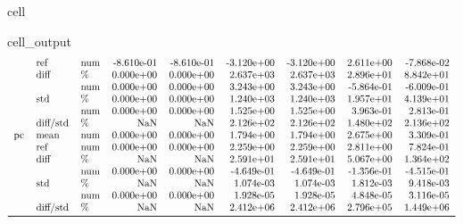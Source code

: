\documentclass[letterpaper,table,10pt,english]{jupyterBook}
\begin{document}
\begin{sphinxuseclass}{cell}
\begin{sphinxVerbatimOutput}
\begin{sphinxuseclass}{cell_output}
\begin{equation*}
\begin{split}
\begin{tabular}{lllrrrrrr}
   & ref & num & -8.610e-01 & -8.610e-01 & -3.120e+00 & -3.120e+00 &  2.611e+00 & -7.868e-02 \\
   & diff & \% &  0.000e+00 &  0.000e+00 &  2.637e+03 &  2.637e+03 &  2.896e+01 &  8.842e+01 \\
   &          & num &  0.000e+00 &  0.000e+00 &  3.243e+00 &  3.243e+00 & -5.864e-01 & -6.009e-01 \\
   & std & \% &  0.000e+00 &  0.000e+00 &  1.240e+03 &  1.240e+03 &  1.957e+01 &  4.139e+01 \\
   &          & num &  0.000e+00 &  0.000e+00 &  1.525e+00 &  1.525e+00 &  3.963e-01 &  2.813e-01 \\
   & diff/std & \% &        NaN &        NaN &  2.126e+02 &  2.126e+02 &  1.480e+02 &  2.136e+02 \\
pc & mean & num &  0.000e+00 &  0.000e+00 &  1.794e+00 &  1.794e+00 &  2.675e+00 &  3.309e-01 \\
   & ref & num &  0.000e+00 &  0.000e+00 &  2.259e+00 &  2.259e+00 &  2.811e+00 &  7.824e-01 \\
   & diff & \% &        NaN &        NaN &  2.591e+01 &  2.591e+01 &  5.067e+00 &  1.364e+02 \\
   &          & num &  0.000e+00 &  0.000e+00 & -4.649e-01 & -4.649e-01 & -1.356e-01 & -4.515e-01 \\
   & std & \% &        NaN &        NaN &  1.074e-03 &  1.074e-03 &  1.812e-03 &  9.418e-03 \\
   &          & num &  0.000e+00 &  0.000e+00 &  1.928e-05 &  1.928e-05 &  4.848e-05 &  3.116e-05 \\
   & diff/std & \% &        NaN &        NaN &  2.412e+06 &  2.412e+06 &  2.796e+05 &  1.449e+06 \\
\bottomrule
\end{tabular}\end{split}
\end{equation*}
\end{sphinxuseclass}\end{sphinxVerbatimOutput}

\end{sphinxuseclass}
\end{document}
